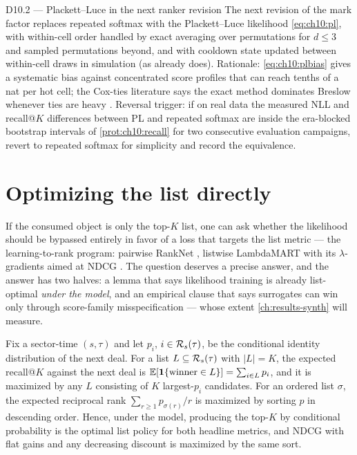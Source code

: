\begin{decision}{D10.2 --- Plackett--Luce in the next ranker revision}
The next revision of the mark factor replaces repeated softmax with the
Plackett--Luce likelihood \cref{eq:ch10:pl}, with within-cell order
handled by exact averaging over permutations for $d \le 3$ and sampled
permutations beyond, and with cooldown state updated between within-cell
draws in simulation (as  already does).
Rationale: \cref{eq:ch10:plbias} gives a systematic bias against
concentrated score profiles that can reach tenths of a nat per hot
cell; the Cox-ties literature says the exact method dominates Breslow
whenever ties are heavy \citep{therneau2000}. Reversal trigger: if on real data the
measured NLL and recall@$K$ differences between PL and repeated softmax
are inside the era-blocked bootstrap intervals of
\cref{prot:ch10:recall} for two consecutive evaluation campaigns, revert
to repeated softmax for simplicity and record the equivalence.
\end{decision}

\section{Optimizing the list directly}\label{ch10:sec:direct}

If the consumed object is only the top-$K$ list, one can ask whether the
likelihood should be bypassed entirely in favor of a loss that targets
the list metric --- the learning-to-rank program: pairwise RankNet
\citep{burges2005}, listwise LambdaMART with its $\lambda$-gradients
aimed at NDCG \citep{burges2010,jarvelin2002}. The question deserves a
precise answer, and the answer has two halves: a lemma that says
likelihood training is already list-optimal \emph{under the model}, and
an empirical clause that says surrogates can win only through
score-family misspecification --- whose extent \cref{ch:results-synth}
will measure.

\begin{lemma}\label{lem:ch10:topk}
Fix a sector-time $(s, \tau)$ and let $p_i$, $i \in \mathcal{R}_s(\tau)$, be
the conditional identity distribution of the next deal. For a list $L
\subseteq \mathcal{R}_s(\tau)$ with $|L| = K$, the expected recall@$K$
against the next deal is $\mathbb{E}[\mathbf{1}\{\text{winner} \in L\}] = \sum_{i \in L}
p_i$, and it is maximized by any $L$ consisting of $K$ largest-$p_i$
candidates. For an ordered list $\sigma$, the expected reciprocal rank
$\sum_{r \ge 1} p_{\sigma(r)} / r$ is maximized by sorting $p$ in
descending order. Hence, under the model, producing the top-$K$ by
conditional probability is the optimal list policy for both headline
metrics, and NDCG with flat gains and any decreasing discount is
maximized by the same sort.
\end{lemma}

